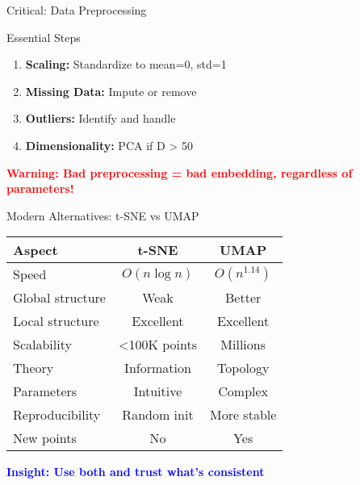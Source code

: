 \documentclass[aspectratio=169]{beamer}
\newcommand{\conceptbox}[2]{\colorbox{#1!20}{\textcolor{#1}{\textbf{#2}}}}
\newcommand{\warning}[1]{\conceptbox{red}{Warning: #1}}
\newcommand{\insight}[1]{\conceptbox{blue}{Insight: #1}}
\begin{document}
\begin{frame}{Critical: Data Preprocessing}
\begin{block}{Essential Steps}
\begin{enumerate}
\item \textbf{Scaling:} Standardize to mean=0, std=1
\item \textbf{Missing Data:} Impute or remove
\item \textbf{Outliers:} Identify and handle
\item \textbf{Dimensionality:} PCA if D > 50
\end{enumerate}
\end{block}

\begin{center}
\end{center}

\warning{Bad preprocessing = bad embedding, regardless of parameters!}
\end{frame}

\begin{frame}{Modern Alternatives: t-SNE vs UMAP}
\begin{center}
\begin{tabular}{l|c|c}
\textbf{Aspect} & \textbf{t-SNE} & \textbf{UMAP} \\
\hline
Speed & $O(n \log n)$ & $O(n^{1.14})$ \\
Global structure & Weak & Better \\
Local structure & Excellent & Excellent \\
Scalability & <100K points & Millions \\
Theory & Information & Topology \\
Parameters & Intuitive & Complex \\
Reproducibility & Random init & More stable \\
New points & No & Yes \\
\end{tabular}
\end{center}

\vspace{0.5cm}
\insight{Use both and trust what's consistent}
\end{frame}
\end{document}
